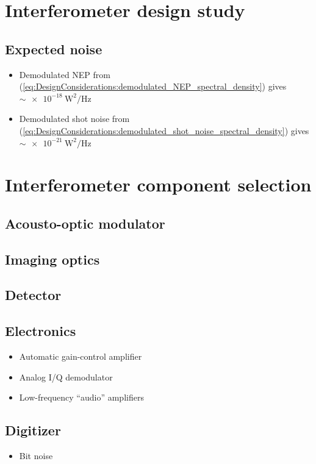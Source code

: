 \section{Interferometer design study}


\subsection{Expected noise}

\begin{itemize}
  \item Demodulated NEP from
    (\ref{eq:DesignConsiderations:demodulated_NEP_spectral_density}) gives
    $\sim \SI{e-18}{\watt\squared\per\hertz}$
  \item Demodulated shot noise from
    (\ref{eq:DesignConsiderations:demodulated_shot_noise_spectral_density})
    gives $\sim \SI{e-21}{\watt\squared\per\hertz}$
\end{itemize}


\section{Interferometer component selection}
\subsection{Acousto-optic modulator}
\subsection{Imaging optics}
\subsection{Detector}
\subsection{Electronics}
\begin{itemize}
  \item Automatic gain-control amplifier
  \item Analog I/Q demodulator
  \item Low-frequency ``audio'' amplifiers
\end{itemize}
\subsection{Digitizer}
\begin{itemize}
  \item Bit noise
\end{itemize}




